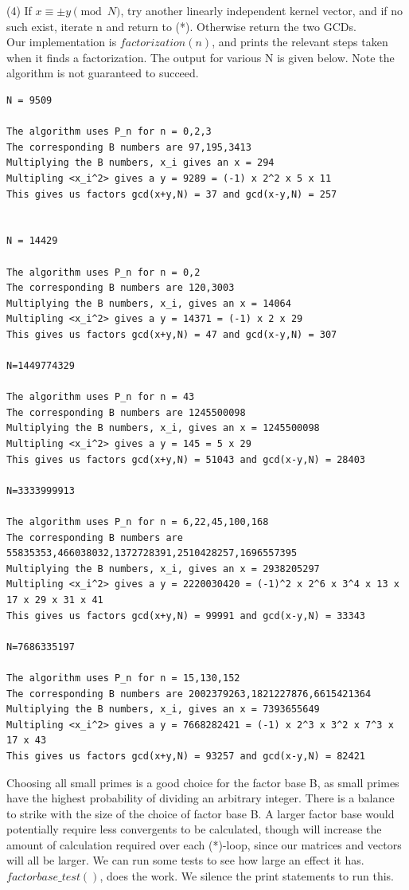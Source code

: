\documentclass[10pt,a4paper]{report}
\begin{document}
(4) If $x \equiv \pm y \pmod N$, try another linearly independent kernel vector, and if no such exist, iterate n and return to (*). Otherwise return the two GCDs.\\
 
Our implementation is $factorization(n)$, and prints the relevant steps taken when it finds a factorization. The output for various N is given below. Note the algorithm is not guaranteed to succeed.

\begin{lstlisting}[breaklines]	
N = 9509

The algorithm uses P_n for n = 0,2,3
The corresponding B numbers are 97,195,3413
Multiplying the B numbers, x_i gives an x = 294
Multipling <x_i^2> gives a y = 9289 = (-1) x 2^2 x 5 x 11
This gives us factors gcd(x+y,N) = 37 and gcd(x-y,N) = 257


N = 14429

The algorithm uses P_n for n = 0,2
The corresponding B numbers are 120,3003
Multiplying the B numbers, x_i, gives an x = 14064
Multipling <x_i^2> gives a y = 14371 = (-1) x 2 x 29
This gives us factors gcd(x+y,N) = 47 and gcd(x-y,N) = 307

N=1449774329

The algorithm uses P_n for n = 43
The corresponding B numbers are 1245500098
Multiplying the B numbers, x_i, gives an x = 1245500098
Multipling <x_i^2> gives a y = 145 = 5 x 29
This gives us factors gcd(x+y,N) = 51043 and gcd(x-y,N) = 28403

N=3333999913

The algorithm uses P_n for n = 6,22,45,100,168
The corresponding B numbers are 55835353,466038032,1372728391,2510428257,1696557395
Multiplying the B numbers, x_i, gives an x = 2938205297
Multipling <x_i^2> gives a y = 2220030420 = (-1)^2 x 2^6 x 3^4 x 13 x 17 x 29 x 31 x 41
This gives us factors gcd(x+y,N) = 99991 and gcd(x-y,N) = 33343

N=7686335197

The algorithm uses P_n for n = 15,130,152
The corresponding B numbers are 2002379263,1821227876,6615421364
Multiplying the B numbers, x_i, gives an x = 7393655649
Multipling <x_i^2> gives a y = 7668282421 = (-1) x 2^3 x 3^2 x 7^3 x 17 x 43
This gives us factors gcd(x+y,N) = 93257 and gcd(x-y,N) = 82421

\end{lstlisting}

Choosing all small primes is a good choice for the factor base B, as small primes have the highest probability of dividing an arbitrary integer. There is a balance to strike with the size of the choice of factor base B. A larger factor base would potentially require less convergents to be calculated, though will increase the amount of calculation required over each (*)-loop, since our matrices and vectors will all be larger. We can run some tests to see how large an effect it has. $factorbase\_test()$, does the work. We silence the print statements to run this.\\
\end{document}
